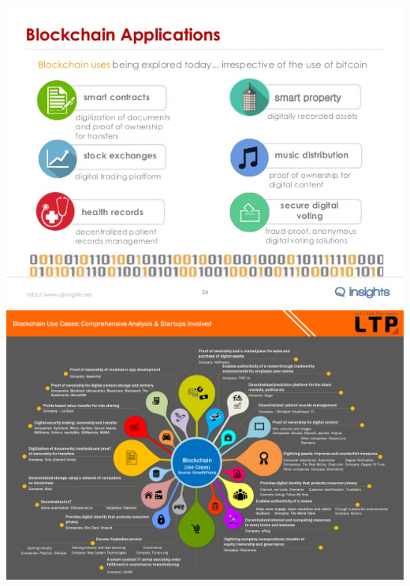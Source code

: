 \documentclass{article}
\begin{document}
\includegraphics[height=4in]{alternative-payments-evolution-or-revolution.jpg}\\
\includegraphics[width=\linewidth]{Blockchain-Usecases-and-Startups.png}
\end{document}
